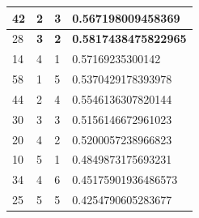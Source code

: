 \begin{small}
\begin{longtable}{|l|l|l|l|}
42                                            & 2                                         & 3                                      & 0.567198009458369                           \\ \hline
28                                            & \textbf{3}                                         & \textbf{2}                                      & \textbf{0.5817438475822965}                          \\ \hline
14                                            & 4                                         & 1                                      & 0.57169235300142                            \\ \hline
58                                            & 1                                         & 5                                      & 0.5370429178393978                          \\ \hline
44                                            & 2                                         & 4                                      & 0.5546136307820144                          \\ \hline
30                                            & 3                                         & 3                                      & 0.5156146672961023                          \\ \hline
20                                            & 4                                         & 2                                      & 0.5200057238966823                          \\ \hline
10                                            & 5                                         & 1                                      & 0.4849873175693231                          \\ \hline
34                                            & 4                                         & 6                                      & 0.45175901936486573                         \\ \hline
25                                            & 5                                         & 5                                      & 0.4254790605283677                          \\ \hline
\end{longtable}
\end{small}
\endgroup

